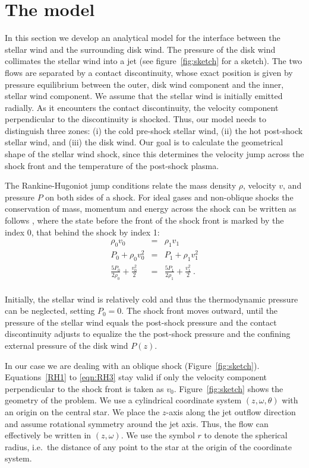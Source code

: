 \section{The model}
\label{sect:model}
In this section we develop an analytical model for the interface between the stellar wind and the surrounding disk wind. The pressure of the disk wind collimates the stellar wind into a jet (see figure~\ref{fig:sketch} for a sketch). The two flows are separated by a contact discontinuity, whose exact position is given by pressure equilibrium between the outer, disk wind component and the inner, stellar wind component. We assume that the stellar wind is initially emitted radially. As it encounters the contact discontinuity, the velocity component perpendicular to the discontinuity is shocked. Thus, our model needs to distinguish three zones: (i) the cold pre-shock stellar wind, (ii) the hot post-shock stellar wind, and (iii) the disk wind. Our goal is to calculate the geometrical shape of the stellar wind shock, since this determines the velocity jump across the shock front and the temperature of the post-shock plasma. 

The Rankine-Hugoniot jump conditions relate the mass density $\rho$, velocity $v$, and pressure $P$ on both sides of a shock. For ideal gases and non-oblique shocks the conservation of mass, momentum and energy across the shock can be written as follows \citep[][chap.~7]{1967pswh.book.....Z}, where the state before the front of the shock front is marked by the index 0, that behind the shock by index 1:
\begin{eqnarray}
\label{eqn:RH1}\rho_0 v_0 &=& \rho_1 v_1\\
\label{eqn:RH2}P_0+\rho_0 v_0^2 &=& P_1+\rho_1 v_1^2\\
\label{eqn:RH3}\frac{5 P_0}{2\rho_0}+\frac{v_0^2}{2}&=&\frac{5 P_1}{2\rho_1}+\frac{v_1^2}{2} \ .\\
\end{eqnarray}

Initially, the stellar wind is relatively cold and thus the thermodynamic pressure can be neglected, setting $P_0=0$.
The shock front moves outward, until the pressure of the stellar wind equals the post-shock pressure and the contact discontinuity adjusts to equalize the the post-shock pressure and the confining external pressure of the disk wind $P(z)$. 

In our case we are dealing with an oblique shock (Figure~\ref{fig:sketch}). Equations~\ref{RH1} to \ref{eqn:RH3} stay valid if only the velocity component perpendicular to the shock front is taken as $v_0$. 
Figure~\ref{fig:sketch} shows the geometry of the problem. We use a cylindrical coordinate system $(z, \omega, \theta)$ with an origin on the central star. We place the $z$-axis along the jet outflow direction and assume rotational symmetry around the jet axis. Thus, the flow can effectively be written in $(z,\omega)$. We use the symbol $r$ to denote the spherical radius, i.e.\ the distance of any point to the star at the origin of the coordinate system.

